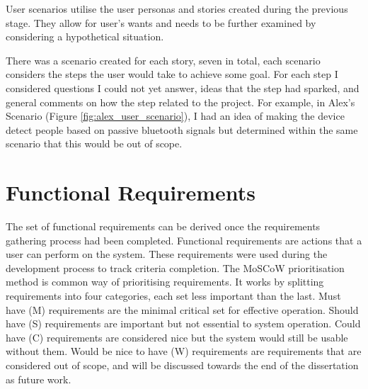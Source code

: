 \documentclass{l4proj}
\begin{document}
User scenarios utilise the user personas and stories created during the previous stage. They allow for user's wants and needs to be further examined by considering a hypothetical situation.

There was a scenario created for each story, seven in total, each scenario considers the steps the user would take to achieve some goal. For each step I considered questions I could not yet answer, ideas that the step had sparked, and general comments on how the step related to the project. For example, in Alex's Scenario (Figure \ref{fig:alex_user_scenario}), I had an idea of making the device detect people based on passive bluetooth signals but determined within the same scenario that this would be out of scope.

\section{Functional Requirements}

The set of functional requirements can be derived once the requirements gathering process had been completed. Functional requirements are actions that a user can perform on the system. These requirements were used during the development process to track criteria completion. The MoSCoW prioritisation method \citet{hudaib_requirements_2018} is common way of prioritising requirements. It works by splitting requirements into four categories, each set less important than the last. Must have (M) requirements are the minimal critical set for effective operation. Should have (S) requirements are important but not essential to system operation. Could have (C) requirements are considered nice but the system would still be usable without them. Would be nice to have (W) requirements are requirements that are considered out of scope, and will be discussed towards the end of the dissertation as future work.
\end{document}
